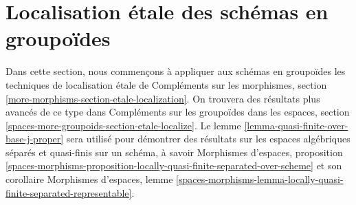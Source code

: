 \section{Localisation \'etale des schémas en groupoïdes}
\label{section-etale-localize}

\noindent
Dans cette section, nous commençons à appliquer aux schémas en groupoïdes les techniques de localisation \'etale de
Compléments sur les morphismes, section \ref{more-morphisms-section-etale-localization}.
On trouvera des résultats plus avancés de ce type dans
Compléments sur les groupoïdes dans les espaces,
section \ref{spaces-more-groupoids-section-etale-localize}.
Le lemme \ref{lemma-quasi-finite-over-base-j-proper}
sera utilisé pour démontrer des résultats sur les espaces algébriques
séparés et quasi-finis sur un schéma, à savoir
Morphismes d'espaces, proposition
\ref{spaces-morphisms-proposition-locally-quasi-finite-separated-over-scheme}
et son corollaire
Morphismes d'espaces, lemme
\ref{spaces-morphisms-lemma-locally-quasi-finite-separated-representable}.

